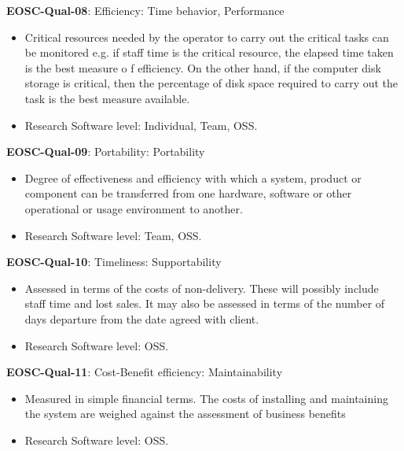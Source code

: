 \textbf{EOSC-Qual-08}: Efficiency: Time behavior, Performance

\begin{itemize}
    \item Critical resources needed by the operator to carry out the critical tasks can be monitored e.g. if staff time is the critical resource, the elapsed time taken is the best measure o f efficiency. On the other hand, if the computer disk storage is critical, then the percentage of disk space required to carry out the task is the best measure available. \cite{iso_25010_2011_2017,gillies_modelling_1992,boehm_quantitative_1976}
    \item Research Software level: Individual, Team, OSS.
\end{itemize}

\textbf{EOSC-Qual-09}: Portability: Portability

\begin{itemize}
    \item Degree of effectiveness and efficiency with which a system, product or component can be transferred from one hardware, software or other operational or usage environment to another. \cite{iso_25010_2011_2017,gillies_modelling_1992,boehm_quantitative_1976,shepherdson_cessda_2019,raymond_software_2013}
    \item Research Software level: Team, OSS.
\end{itemize}

\textbf{EOSC-Qual-10}: Timeliness: Supportability

\begin{itemize}
    \item Assessed in terms of the costs of non-delivery. These will possibly include staff time and lost sales. It may also be assessed in terms of the number of days departure from the date agreed with client. \cite{gillies_modelling_1992}
    \item Research Software level: OSS.
\end{itemize}

\textbf{EOSC-Qual-11}: Cost-Benefit efficiency: Maintainability

\begin{itemize}
    \item Measured in simple financial terms. The costs of installing and maintaining the system are weighed against the assessment of business benefits \cite{gillies_modelling_1992}
    \item Research Software level: OSS.
\end{itemize}

